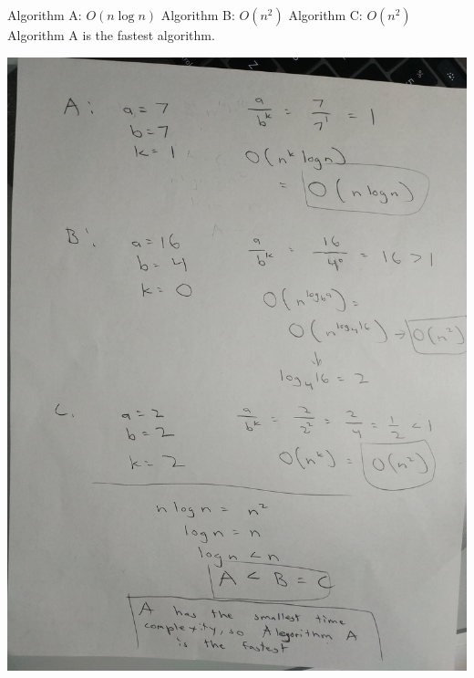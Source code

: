 \documentclass[12pt]{article}
\begin{document}
Algorithm A: $O(n\log n)$
\newline
Algorithm B: $O(n^2)$
\newline
Algorithm C: $O(n^2)$
\newline
\newline
Algorithm A is the fastest algorithm.
\begin{center}
\includegraphics[scale=0.14, angle=270]{hi.jpg}
\end{center}

\newpage
\end{document}
